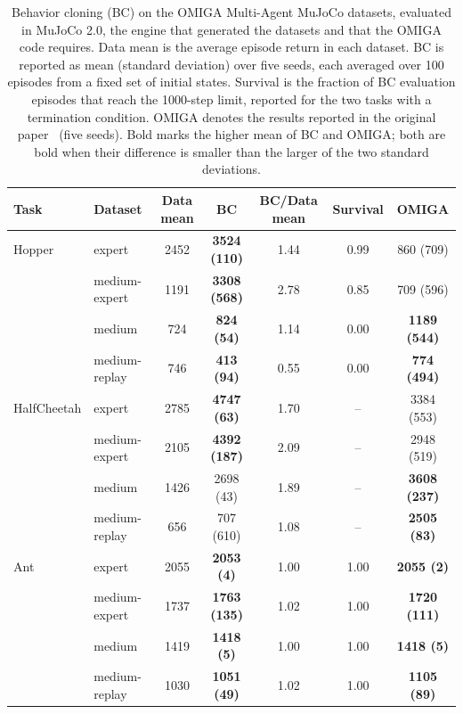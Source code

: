 \begin{table}[t]
\centering
\caption{Behavior cloning (BC) on the OMIGA Multi-Agent MuJoCo datasets, evaluated in MuJoCo 2.0, the engine that generated the datasets and that the OMIGA code requires. Data mean is the average episode return in each dataset. BC is reported as mean (standard deviation) over five seeds, each averaged over 100 episodes from a fixed set of initial states. Survival is the fraction of BC evaluation episodes that reach the 1000-step limit, reported for the two tasks with a termination condition. OMIGA denotes the results reported in the original paper~\cite{wang2023offline} (five seeds). Bold marks the higher mean of BC and OMIGA; both are bold when their difference is smaller than the larger of the two standard deviations.}
\label{tab:bc}
\begin{tabular*}{\textwidth}{@{\extracolsep{\fill}}llccccc}
\hline
Task & Dataset & Data mean & BC & BC/Data mean & Survival & OMIGA \\
\hline
Hopper & expert & 2452 & \textbf{3524 (110)} & 1.44 & 0.99 & 860 (709) \\
 & medium-expert & 1191 & \textbf{3308 (568)} & 2.78 & 0.85 & 709 (596) \\
 & medium & 724 & \textbf{824 (54)} & 1.14 & 0.00 & \textbf{1189 (544)} \\
 & medium-replay & 746 & \textbf{413 (94)} & 0.55 & 0.00 & \textbf{774 (494)} \\
\hline
HalfCheetah & expert & 2785 & \textbf{4747 (63)} & 1.70 & -- & 3384 (553) \\
 & medium-expert & 2105 & \textbf{4392 (187)} & 2.09 & -- & 2948 (519) \\
 & medium & 1426 & 2698 (43) & 1.89 & -- & \textbf{3608 (237)} \\
 & medium-replay & 656 & 707 (610) & 1.08 & -- & \textbf{2505 (83)} \\
\hline
Ant & expert & 2055 & \textbf{2053 (4)} & 1.00 & 1.00 & \textbf{2055 (2)} \\
 & medium-expert & 1737 & \textbf{1763 (135)} & 1.02 & 1.00 & \textbf{1720 (111)} \\
 & medium & 1419 & \textbf{1418 (5)} & 1.00 & 1.00 & \textbf{1418 (5)} \\
 & medium-replay & 1030 & \textbf{1051 (49)} & 1.02 & 1.00 & \textbf{1105 (89)} \\
\hline
\end{tabular*}
\end{table}
